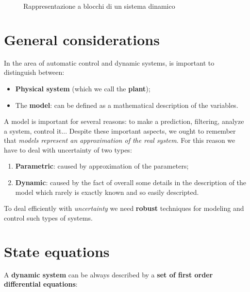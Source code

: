 \begin{figure}
    \centering


    
    \caption{Rappresentazione a blocchi di un sistema dinamico}
    \label{fig:enter-label}
\end{figure}

\section{General considerations}
In the area of automatic control and dynamic systems, is important to distinguish between:
\begin{itemize}
    \item \textbf{Physical system} (which we call the \textbf{plant});
    \item The \textbf{model}: can be defined as a mathematical description of the variables.
\end{itemize}
A model is important for several reasons: to make a prediction, filtering, analyze a system, control it... Despite these important aspects, we ought to remember that \textit{models represent an approximation of the real system}. For this reason we have to deal with uncertainty of two types: 
\begin{enumerate}
\setlength\itemsep{0em}
    \item \textbf{Parametric}: caused by approximation of the parameters; 
    \item \textbf{Dynamic}: caused by the fact of overall some details in the description of the model which rarely is exactly known and so easily descripted. 
\end{enumerate}

To deal efficiently with \textit{uncertainty} we need \textbf{robust} techniques for modeling and control such types of systems.

\section {State equations}
A \textbf{dynamic system} can be always described by a \textbf{set of first order differential equations}:

